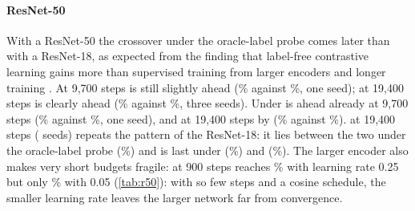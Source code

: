 \paragraph{ResNet-50}
With a ResNet-50 the crossover under the oracle-label probe comes later than with a ResNet-18, as expected
from the finding that label-free contrastive learning gains more than supervised training from larger
encoders and longer training \citep{chen2020simclr}. At 9,700
steps \supcon is still slightly ahead (\% against
\%, one seed); at 19,400 steps \simclr is clearly ahead
(\% against \%, three seeds). Under \ftfive
\simclr is ahead already at 9,700 steps (\% against
\%, one seed), and at 19,400 steps by \pt
(\% against \%). \union at 19,400 steps
( seeds) repeats the pattern of the ResNet-18: it lies between the two under the oracle-label
probe (\%) and is last under \lpfive (\%) and \ftfive
(\%). The larger encoder also makes very short budgets fragile: at 900 steps
\supcon reaches \% with learning rate 0.25 but only
\% with 0.05 (\cref{tab:r50}): with so few steps and a cosine
schedule, the smaller learning rate leaves the larger network far from convergence.
